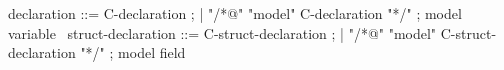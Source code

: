\begin{syntax}
  declaration ::= C-declaration ;
  | {"/*@" "model" C-declaration "*/"} ; model variable
  \
  struct-declaration ::= C-struct-declaration ;
  | {"/*@" "model" C-struct-declaration "*/"} ; model field
\end{syntax}


